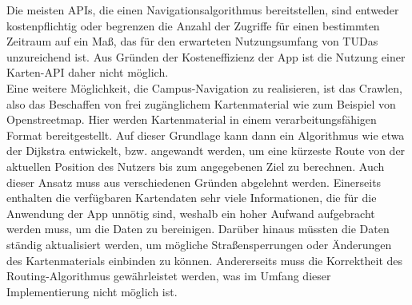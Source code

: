 \documentclass[noindent]{tudreport}
\begin{document}
			Die meisten APIs, die einen Navigationsalgorithmus bereitstellen, sind entweder kostenpflichtig oder begrenzen die Anzahl der Zugriffe für einen bestimmten Zeitraum auf ein Maß, das für den erwarteten Nutzungsumfang von TUDas unzureichend ist. Aus Gründen der Kosteneffizienz der App ist die Nutzung einer Karten-API daher nicht möglich.\\
			Eine weitere Möglichkeit, die Campus-Navigation zu realisieren, ist das Crawlen, also das Beschaffen von frei zugänglichem Kartenmaterial wie zum Beispiel von Openstreetmap. %
			Hier werden Kartenmaterial in einem verarbeitungsfähigen Format bereitgestellt. Auf dieser Grundlage kann dann ein Algorithmus wie etwa der Dijkstra entwickelt, bzw. angewandt werden, um eine kürzeste Route von der aktuellen Position des Nutzers bis zum angegebenen Ziel zu berechnen. Auch dieser Ansatz muss aus verschiedenen Gründen abgelehnt werden. Einerseits enthalten die verfügbaren Kartendaten sehr viele Informationen, die für die Anwendung der App unnötig sind, weshalb ein hoher Aufwand aufgebracht werden muss, um die Daten zu bereinigen. Darüber hinaus müssten die Daten ständig aktualisiert werden, um mögliche Straßensperrungen oder Änderungen des Kartenmaterials einbinden zu können. Andererseits muss die Korrektheit des Routing-Algorithmus gewährleistet werden, was im Umfang dieser Implementierung nicht möglich ist.
\end{document}
